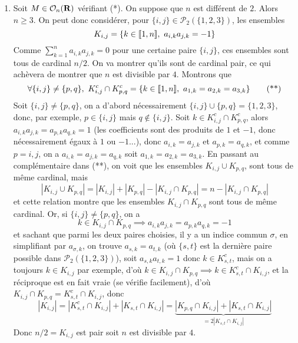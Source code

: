 \begin{correction}
\begin{enumerate}
		\item Soit $M\in\mathcal O_n(\operatorname{\mathbf{R}})$ vérifiant (*).
		On suppose que $n$ est différent de $2$. Alors $n\geq 3$.
		On peut donc considérer, pour $\lbrace i,j\rbrace\in\mathcal P_2(\lbrace1,2,3\rbrace)$, les ensembles
		\[
			K_{i,j}=\lbrace k \in\inl1n,\ a_{i,k}a_{j,k}=-1\rbrace	
		\]
		Comme $\sum_{k=1}^na_{i,k}a_{j,k}=0$ pour une certaine paire $\lbrace i,j\rbrace$, ces ensembles sont tous de cardinal $n/2$. 
		On va montrer qu'ils sont de cardinal pair, ce qui achèvera de montrer que $n$ est divisible par $4$.
		Montrons que 
		\[
			\forall \lbrace i,j\rbrace\neq\lbrace p,q\rbrace,\ K_{i,j}^c\cap K_{p,q}^c=\lbrace k\in[\![1,n]\!],\ a_{1,k}=a_{2,k}=a_{3,k}\rbrace\tag*{(**)}
		\]
		Soit $\lbrace i,j\rbrace\neq\lbrace p,q\rbrace$, on a d'abord nécessairement $\lbrace i,j\rbrace\cup\lbrace p,q\rbrace=\lbrace 1,2,3\rbrace$, donc, par exemple, $p\in\lbrace i,j\rbrace$ mais $q\notin \lbrace i,j\rbrace$.
		Soit $k\in K_{i,j}^c\cap K_{p,q}^c$, alors $a_{i,k}a_{j,k}=a_{p,k}a_{q,k}=1$ (les coefficients sont des produits de $1$ et $-1$, donc nécessairement égaux à $1$ ou $-1$...),
		donc $a_{i,k}=a_{j,k}$ et $a_{p,k}=a_{q,k}$, et comme $p=i,j$, on a $a_{i,k}=a_{j,k}=a_{q,k}$ soit $a_{1,k}=a_{2,k}=a_{3,k}$.
		En passant au complémentaire dans (**), on voit que les ensembles $K_{i,j}\cup K_{p,q}$, sont tous de même cardinal, mais 
		\[
			|K_{i,j}\cup K_{p,q}|=|K_{i,j}|+|K_{p,q}|-|K_{i,j}\cap K_{p,q}|=n-|K_{i,j}\cap K_{p,q}|
		\]
		et cette relation montre que les ensembles $K_{i,j}\cap K_{p,q}$ sont tous de même cardinal.
		Or, si $\lbrace i,j\rbrace\neq\lbrace p,q\rbrace$, on a 
		\[
			k\in K_{i,j}\cap K_{p,q}\implies a_{i,k}a_{j,k}=a_{p,k}a_{q,k}=-1
		\]
		et sachant que parmi les deux paires choisies, il y a un indice commun $\sigma$, en simplifiant par $a_{\sigma,k}$,
		on trouve $a_{s,k}=a_{t,k}$ (où $\lbrace s,t\rbrace$ est la dernière paire possible dans $\mathcal P_2(\lbrace 1,2,3\rbrace)$), soit 
		$a_{s,k}a_{t,k}=1$ donc $k\in K_{s,t}^c$, mais on a toujours $k\in K_{i,j}$ par exemple, d'où $k\in K_{i,j}\cap K_{p,q}\implies k\in K_{s,t}^c\cap K_{i,j}$,
		et la réciproque est en fait vraie (se vérifie facilement), d'où $K_{i,j}\cap K_{p,q}=K_{s,t}^c\cap K_{i,j}$, donc 
		\[
			|K_{i,j}|=|K_{s,t}^c\cap K_{i,j}|+|K_{s,t}\cap K_{i,j}|=\underbrace{|K_{p,q}\cap K_{i,j}|+|K_{s,t}\cap K_{i,j}|}_{=2|K_{s,t}\cap K_{i,j}|}
		\]
		Donc $n/2=K_{i,j}$ est pair soit $n$ est divisible par $4$.
	\end{enumerate}
\end{correction}


